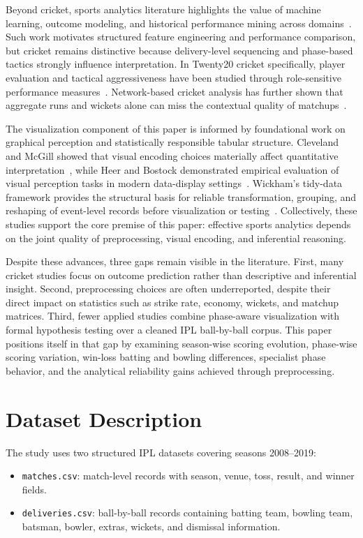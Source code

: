 \documentclass[conference]{IEEEtran}
\begin{document}
Beyond cricket, sports analytics literature highlights the value of machine learning, outcome modeling, and historical performance mining across domains~\cite{ref8,ref9,ref10}. Such work motivates structured feature engineering and performance comparison, but cricket remains distinctive because delivery-level sequencing and phase-based tactics strongly influence interpretation. In Twenty20 cricket specifically, player evaluation and tactical aggressiveness have been studied through role-sensitive performance measures~\cite{ref14,ref15}. Network-based cricket analysis has further shown that aggregate runs and wickets alone can miss the contextual quality of matchups~\cite{ref16}.

The visualization component of this paper is informed by foundational work on graphical perception and statistically responsible tabular structure. Cleveland and McGill showed that visual encoding choices materially affect quantitative interpretation~\cite{ref11}, while Heer and Bostock demonstrated empirical evaluation of visual perception tasks in modern data-display settings~\cite{ref12}. Wickham's tidy-data framework provides the structural basis for reliable transformation, grouping, and reshaping of event-level records before visualization or testing~\cite{ref13}. Collectively, these studies support the core premise of this paper: effective sports analytics depends on the joint quality of preprocessing, visual encoding, and inferential reasoning.

Despite these advances, three gaps remain visible in the literature. First, many cricket studies focus on outcome prediction rather than descriptive and inferential insight. Second, preprocessing choices are often underreported, despite their direct impact on statistics such as strike rate, economy, wickets, and matchup matrices. Third, fewer applied studies combine phase-aware visualization with formal hypothesis testing over a cleaned IPL ball-by-ball corpus. This paper positions itself in that gap by examining season-wise scoring evolution, phase-wise scoring variation, win-loss batting and bowling differences, specialist phase behavior, and the analytical reliability gains achieved through preprocessing.

\section{Dataset Description}
The study uses two structured IPL datasets covering seasons 2008--2019:
\begin{itemize}
    \item \texttt{matches.csv}: match-level records with season, venue, toss, result, and winner fields.
    \item \texttt{deliveries.csv}: ball-by-ball records containing batting team, bowling team, batsman, bowler, extras, wickets, and dismissal information.
\end{itemize}
\end{document}

